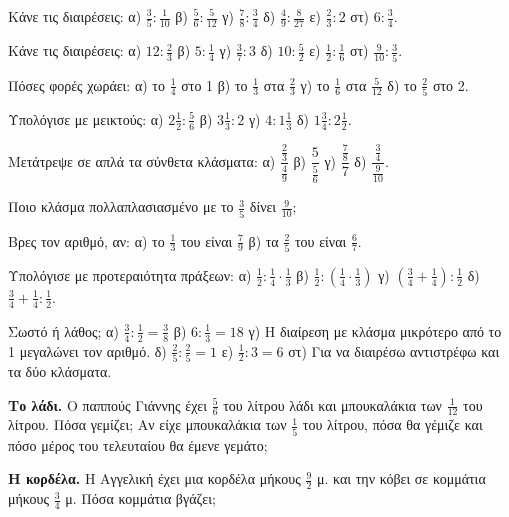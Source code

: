 

\ex Κάνε τις διαιρέσεις: α) $\frac{3}{5}:\frac{1}{10}$ \quad β) $\frac{5}{6}:\frac{5}{12}$ \quad γ) $\frac{7}{8}:\frac{3}{4}$ \quad δ) $\frac{4}{9}:\frac{8}{27}$ \quad ε) $\frac{2}{3}:2$ \quad στ) $6:\frac{3}{4}$.

\ex Κάνε τις διαιρέσεις: α) $12:\frac{2}{3}$ \quad β) $5:\frac{1}{4}$ \quad γ) $\frac{3}{7}:3$ \quad δ) $10:\frac{5}{2}$ \quad ε) $\frac{1}{2}:\frac{1}{6}$ \quad στ) $\frac{9}{10}:\frac{3}{5}$.

\ex Πόσες φορές χωράει: α) το $\frac{1}{4}$ στο 1 \quad β) το $\frac{1}{3}$ στα $\frac{2}{3}$ \quad γ) το $\frac{1}{6}$ στα $\frac{5}{12}$ \quad δ) το $\frac{2}{5}$ στο 2.

\ex Υπολόγισε με μεικτούς: α) $2\frac{1}{2}:\frac{5}{6}$ \quad β) $3\frac{1}{3}:2$ \quad γ) $4:1\frac{1}{3}$ \quad δ) $1\frac{3}{4}:2\frac{1}{2}$.

\ex Μετάτρεψε σε απλά τα σύνθετα κλάσματα: α) $\dfrac{\frac{2}{3}}{\frac{4}{9}}$ \quad β) $\dfrac{5}{\frac{5}{6}}$ \quad γ) $\dfrac{\frac{7}{8}}{7}$ \quad δ) $\dfrac{\frac{3}{4}}{\frac{9}{10}}$.

\ex Ποιο κλάσμα πολλαπλασιασμένο με το $\frac{3}{5}$ δίνει $\frac{9}{10}$;

\ex Βρες τον αριθμό, αν: α) το $\frac{1}{3}$ του είναι $\frac{7}{9}$ \quad β) τα $\frac{2}{5}$ του είναι $\frac{6}{7}$.

\ex Υπολόγισε με προτεραιότητα πράξεων: α) $\frac{1}{2}:\frac{1}{4}\cdot\frac{1}{3}$ \quad β) $\frac{1}{2}:\left(\frac{1}{4}\cdot\frac{1}{3}\right)$ \quad γ) $\left(\frac{3}{4}+\frac{1}{4}\right):\frac{1}{2}$ \quad δ) $\frac{3}{4}+\frac{1}{4}:\frac{1}{2}$.

\ex Σωστό ή λάθος; α) $\frac{3}{4}:\frac{1}{2}=\frac{3}{8}$ \quad β) $6:\frac{1}{3}=18$ \quad γ) Η διαίρεση με κλάσμα μικρότερο από το 1 μεγαλώνει τον αριθμό. \quad δ) $\frac{2}{5}:\frac{2}{5}=1$ \quad ε) $\frac{1}{2}:3=6$ \quad στ) Για να διαιρέσω αντιστρέφω και τα δύο κλάσματα.


\ex \textbf{Το λάδι.} Ο παππούς Γιάννης έχει $\frac{5}{6}$ του λίτρου λάδι και μπουκαλάκια των $\frac{1}{12}$ του λίτρου. Πόσα γεμίζει; Αν είχε μπουκαλάκια των $\frac{1}{5}$ του λίτρου, πόσα θα γέμιζε και πόσο μέρος του τελευταίου θα έμενε γεμάτο;

\ex \textbf{Η κορδέλα.} Η Αγγελική έχει μια κορδέλα μήκους $\frac{9}{2}$ μ. και την κόβει σε κομμάτια μήκους $\frac{3}{4}$ μ. Πόσα κομμάτια βγάζει;

